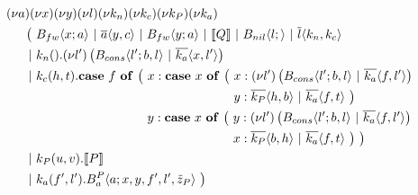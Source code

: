 \begin{align*}
  &\anew{a}{\anew{x}{\anew{y}{\anew{l}{\anew{k_n}{\anew{k_c}{\anew{k_P}{\anew{k_a}{ \\
    &\hspace{0.5cm}
    \begin{aligned}[t]
      \big(\ &\ains{B_{fw}}{x}{a}
      \apar   \asnd{a}{y,c}
      \apar   \ains{B_{fw}}{y}{a}
      \apar   \encMJtoAP{Q}
      \apar   \ains{B_{nil}}{l}{}
      \apar   \asnd{l}{k_n,k_c}
      \\
      \apar  &\arcv{k_n}{} . \anew{l'}{\parens{\ains{B_{cons}}{l'}{b, l} \apar \asnd{k_a}{x, l'}}}
      \\
      \apar  &\arcv{k_c}{h,t} .
        \begin{aligned}[t]
          \acse*{f}{\big(\ 
            &\aalt{x}{
              \begin{aligned}[t]
                \acse*{x}{\big(\ 
                  &\aalt{x}{\anew*{l'}{
                    \ains{B_{cons}}{l'}{b,l} \apar \asnd{k_a}{f,l'}
                  }}\\
                  &\aalt{y}{
                    \asnd{k_P}{h,b} \apar \asnd{k_a}{f,t}
                  }\ 
                \big)}
              \end{aligned}
            }\\
            &\aalt{y}{
              \begin{aligned}[t]
                \acse*{x}{\big(\ 
                  &\aalt{y}{\anew*{l'}{
                    \ains{B_{cons}}{l'}{b,l} \apar \asnd{k_a}{f,l'}
                  }}\\
                  &\aalt{x}{
                    \asnd{k_P}{b,h} \apar \asnd{k_a}{f,t}
                  }\ 
                \big)}
                \ \big)
              \end{aligned}
            }\ 
          }
        \end{aligned}
      \\
      \apar  &\arcv{k_P}{u,v} . \encMJtoAP{P}
      \\
      \apar  &\arcv{k_a}{f',l'} . \ains{B_a^P}{a}{x, y, f', l',\tilde{z}_P}
      \ \big)
    \end{aligned}
  }}}}}}}}
\end{align*}


